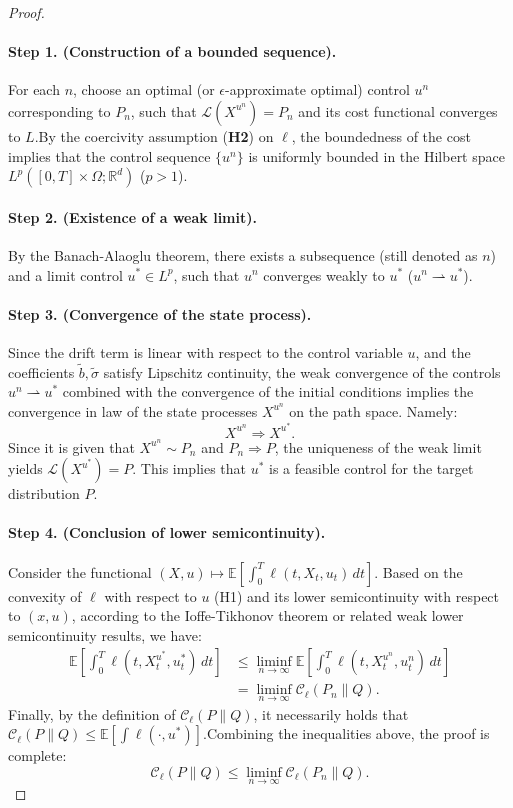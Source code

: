 \documentclass[11pt]{article}
\def\w{\widetilde}
\begin{document}
\begin{proof}
\paragraph{Step 1. (Construction of a bounded sequence).}
For each $n$, choose an optimal (or $\epsilon$-approximate optimal) control $u^n$ corresponding to $P_n$, such that $\mathcal L(X^{u^n}) = P_n$ and its cost functional converges to $L$.By the coercivity assumption (\textbf{H2}) on $\ell$, the boundedness of the cost implies that the control sequence $\{u^n\}$ is uniformly bounded in the Hilbert space $L^p([0, T] \times \Omega; \mathbb{R}^d)$ ($p>1$).

\paragraph{Step 2. (Existence of a weak limit).}
By the Banach-Alaoglu theorem, there exists a subsequence (still denoted as $n$) and a limit control $u^* \in L^p$, such that $u^n$ converges weakly to $u^*$ ($u^n \rightharpoonup u^*$).

\paragraph{Step 3. (Convergence of the state process).}
Since the drift term is linear with respect to the control variable $u$, and the coefficients $\w{b}, \w{\sigma}$ satisfy Lipschitz continuity, the weak convergence of the controls $u^n \rightharpoonup u^*$ combined with the convergence of the initial conditions implies the convergence in law of the state processes $X^{u^n}$ on the path space. Namely:$$X^{u^n} \Rightarrow X^{u^*}.$$Since it is given that $X^{u^n} \sim P_n$ and $P_n \Rightarrow P$, the uniqueness of the weak limit yields $\mathcal L(X^{u^*}) = P$. This implies that $u^*$ is a feasible control for the target distribution $P$.

\paragraph{Step 4. (Conclusion of lower semicontinuity).}
Consider the functional $(X, u) \mapsto \mathbb{E}[\int_0^T \ell(t, X_t, u_t)\,dt]$. Based on the convexity of $\ell$ with respect to $u$ ({H1}) and its lower semicontinuity with respect to $(x, u)$, according to the Ioffe-Tikhonov theorem or related weak lower semicontinuity results, we have:$$\begin{aligned}
\mathbb{E}\left[\int_0^T \ell(t, X_t^{u^*}, u^*_t)\, dt\right] &\le \liminf_{n \to \infty} \mathbb{E}\left[\int_0^T \ell(t, X_t^{u^n}, u^n_t)\, dt\right] \\
&= \liminf_{n \to \infty} \mathcal C_\ell(P_n\|Q).
\end{aligned}$$Finally, by the definition of $\mathcal C_\ell(P\|Q)$, it necessarily holds that $\mathcal C_\ell(P\|Q) \le \mathbb{E}[\int \ell(\cdot, u^*)]$.Combining the inequalities above, the proof is complete:$$\mathcal C_\ell(P\|Q) \le \liminf_{n \to \infty} \mathcal C_\ell(P_n\|Q).$$
\end{proof}
\end{document}
